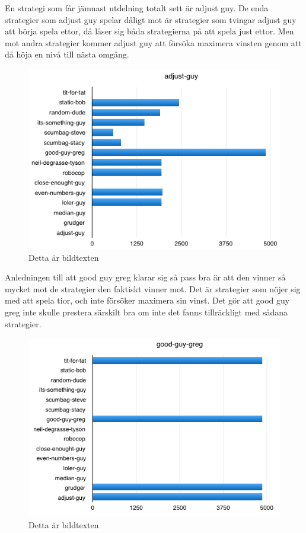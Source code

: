 En strategi som får jämnast utdelning totalt sett är adjust guy. De enda strategier som adjust guy spelar dåligt mot är strategier som tvingar adjust guy att börja spela ettor, då låser sig båda strategierna på att spela just ettor. Men mot andra strategier kommer adjust guy att försöka maximera vinsten genom att då höja en nivå till nästa omgång.
\begin{figure}[htb]
	\begin{center}
	\includegraphics[scale=0.75, angle=0]{bilder/adjust-guy.png}
	\caption{Detta är bildtexten}
	\label{adjust-guy}
	\end{center}
\end{figure}
Anledningen till att good guy greg klarar sig så pass bra är att den vinner så mycket mot de strategier den faktiskt vinner mot. Det är strategier som nöjer sig med att spela tior, och inte försöker maximera sin vinst. Det gör att good guy greg inte skulle prestera särskilt bra om inte det fanns tillräckligt med sådana strategier.

\begin{figure}[htb]
	\begin{center}
	\includegraphics[scale=0.75, angle=0]{bilder/good-guy-greg.png}
	\caption{Detta är bildtexten}
	\label{good-guy-greg}
	\end{center}
\end{figure}


